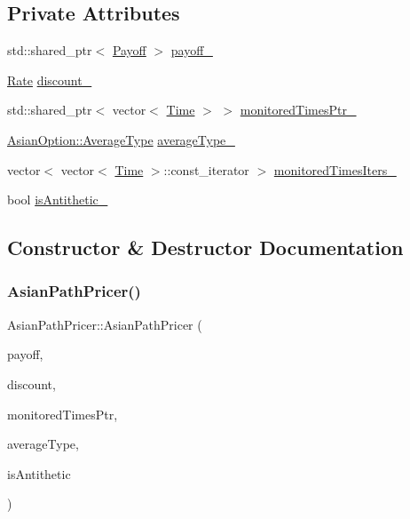 \subsection*{Private Attributes}
\begin{DoxyCompactItemize}
\item 
std\+::shared\+\_\+ptr$<$ \hyperlink{class_payoff}{Payoff} $>$ \hyperlink{class_asian_path_pricer_a21540fed13894f9f62828d9817de8f5f}{payoff\+\_\+}
\item 
\hyperlink{_name_def_8h_a25bee43a162de339c81f3d1caf6b887d}{Rate} \hyperlink{class_asian_path_pricer_a3b8dfce72f9ec0d56c116b7b27e8504f}{discount\+\_\+}
\item 
std\+::shared\+\_\+ptr$<$ vector$<$ \hyperlink{_name_def_8h_ac2d3e0ba793497bcca555c7c2cf64ff3}{Time} $>$ $>$ \hyperlink{class_asian_path_pricer_aa774ae5f2659aee3a7b5e40b3089c3be}{monitored\+Times\+Ptr\+\_\+}
\item 
\hyperlink{class_asian_option_add7292791bf85820ff9fdbfd4407f3b9}{Asian\+Option\+::\+Average\+Type} \hyperlink{class_asian_path_pricer_a28ff57b497033627d84ffa2273b6613e}{average\+Type\+\_\+}
\item 
vector$<$ vector$<$ \hyperlink{_name_def_8h_ac2d3e0ba793497bcca555c7c2cf64ff3}{Time} $>$\+::const\+\_\+iterator $>$ \hyperlink{class_asian_path_pricer_acad7de97a262edf4e9f0ebb5f70e81f1}{monitored\+Times\+Iters\+\_\+}
\item 
bool \hyperlink{class_asian_path_pricer_ad42c5d8d3b3d1c66d01620491c07bef6}{is\+Antithetic\+\_\+}
\end{DoxyCompactItemize}


\subsection{Constructor \& Destructor Documentation}
\hypertarget{class_asian_path_pricer_a8e295461d8e635e39d8075810bcc1e6a}{}\label{class_asian_path_pricer_a8e295461d8e635e39d8075810bcc1e6a} 
\subsubsection{\texorpdfstring{Asian\+Path\+Pricer()}{AsianPathPricer()}}
{\footnotesize\ttfamily Asian\+Path\+Pricer\+::\+Asian\+Path\+Pricer (\begin{DoxyParamCaption}\item[{std\+::shared\+\_\+ptr$<$ \hyperlink{class_payoff}{Payoff} $>$}]{payoff,  }\item[{\hyperlink{_name_def_8h_a25bee43a162de339c81f3d1caf6b887d}{Rate}}]{discount,  }\item[{std\+::shared\+\_\+ptr$<$ vector$<$ \hyperlink{_name_def_8h_ac2d3e0ba793497bcca555c7c2cf64ff3}{Time} $>$ $>$}]{monitored\+Times\+Ptr,  }\item[{\hyperlink{class_asian_option_add7292791bf85820ff9fdbfd4407f3b9}{Asian\+Option\+::\+Average\+Type}}]{average\+Type,  }\item[{bool}]{is\+Antithetic }\end{DoxyParamCaption})}



